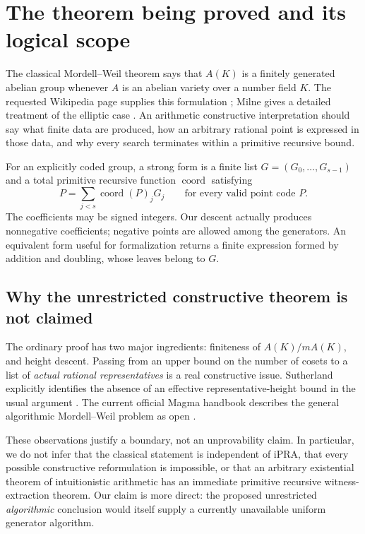 \section{The theorem being proved and its logical scope}
\label{sec:scope}

The classical Mordell--Weil theorem says that $A(K)$ is a finitely generated
abelian group whenever $A$ is an abelian variety over a number field $K$.
The requested Wikipedia page supplies this formulation
\cite{wikipedia}; Milne gives a detailed treatment of the elliptic case
\cite{milne}. An arithmetic constructive interpretation should say what
finite data are produced, how an arbitrary rational point is expressed in
those data, and why every search terminates within a primitive recursive
bound.

For an explicitly coded group, a strong form is a finite list
$G=(G_0,\ldots,G_{s-1})$ and a total primitive recursive function
$\operatorname{coord}$ satisfying
\[
 P=\sum_{j<s}\operatorname{coord}(P)_jG_j
 \qquad\text{for every valid point code }P.
 \tag{1.1}
\]
The coefficients may be signed integers. Our descent actually produces
nonnegative coefficients; negative points are allowed among the generators.
An equivalent form useful for formalization returns a finite expression
formed by addition and doubling, whose leaves belong to $G$.

\subsection{Why the unrestricted constructive theorem is not claimed}

The ordinary proof has two major ingredients: finiteness of
$A(K)/mA(K)$, and height descent. Passing from an upper bound on the number
of cosets to a list of \emph{actual rational representatives} is a real
constructive issue. Sutherland explicitly identifies the absence of an
effective representative-height bound in the usual argument
\cite{sutherland}. The current official Magma handbook describes the
general algorithmic Mordell--Weil problem as open \cite{magma}.

These observations justify a boundary, not an unprovability claim.
In particular, we do not infer that the classical statement is independent
of iPRA, that every possible constructive reformulation is impossible, or
that an arbitrary existential theorem of intuitionistic arithmetic has an
immediate primitive recursive witness-extraction theorem. Our claim is
more direct: the proposed unrestricted \emph{algorithmic} conclusion would
itself supply a currently unavailable uniform generator algorithm.

